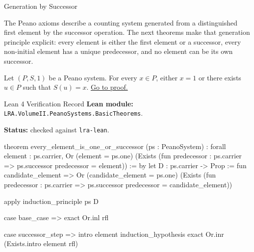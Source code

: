 \begin{topicbox}{Generation by Successor}
\begin{exposition}
The Peano axioms describe a counting system generated from a distinguished
first element by the successor operation. The next theorems make that
generation principle explicit: every element is either the first element or a
successor, every non-initial element has a unique predecessor, and no element
can be its own successor.
\end{exposition}

\begin{tcolorbox}[colback=thmbox, colframe=thmborder, arc=2pt,
  left=6pt, right=6pt, top=4pt, bottom=4pt,
  title={\small\textbf{Theorem (Every Element Is Either \texorpdfstring{$1$}{1} or a Successor)}} ,
  fonttitle=\small\bfseries]
\begin{theorem}
\label{thm:every-element-is-one-or-a-successor}
Let $(P,S,1)$ be a Peano system. For every $x \in P$, either $x=1$ or there
exists $u \in P$ such that $S(u)=x$.
\hyperref[prf:every-element-is-one-or-a-successor]{Go to proof.}
\end{theorem}
\end{tcolorbox}

\begin{formalizationrecord}{Lean 4 Verification Record}
\textbf{Lean module:} \texttt{LRA.VolumeII.PeanoSystems.BasicTheorems}.\par
{}
\textbf{Status:} checked against \texttt{lra-lean}.\par

\begin{leancode}
theorem every_element_is_one_or_successor
    (ps : PeanoSystem) :
    forall element : ps.carrier,
      Or (element = ps.one)
        (Exists (fun predecessor : ps.carrier =>
          ps.successor predecessor = element)) := by
  let D : ps.carrier -> Prop :=
    fun candidate_element =>
      Or (candidate_element = ps.one)
        (Exists (fun predecessor : ps.carrier =>
          ps.successor predecessor = candidate_element))

  apply induction_principle ps D

  case base_case =>
    exact Or.inl rfl

  case successor_step =>
    intro element induction_hypothesis
    exact Or.inr (Exists.intro element rfl)
\end{leancode}
\end{formalizationrecord}


\end{topicbox}
